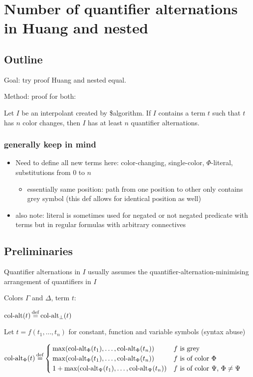 \documentclass[,%
	draft=false,%
	numbers=noendperiod
	12pt,
	a4paper,
	oneside,%
	openany,
]{memoir}
\begin{document}
\chapter{ Number of quantifier alternations in Huang and nested }

\section{ Outline }

Goal: try proof Huang and nested equal.

Method: proof for both:

\begin{cprop}
	Let $I$ be an interpolant created by \$algorithm.
	If $I$ contains a term $t$ such that $t$ has $n$ color changes, then $I$ has at least $n$ quantifier alternations.
\end{cprop}

\subsection{generally keep in mind}

\begin{itemize}
	\item Need to define all new terms here: color-changing, single-color, $\Phi$-literal, substitutions from $0$ to $n$
		\begin{itemize}
			\item essentially same position: path from one position to other only contains grey symbol (this def allows for identical position as well)
		\end{itemize}
	\item also note: literal is sometimes used for negated or not negated predicate with terms but in regular formulas with arbitrary connectives
\end{itemize}

\section{ Preliminaries }

Quantifier alternations in $I$ usually assumes the quantifier-alternation-minimising arrangement of quantifiers in $I$ 

\begin{defi}
	Colors $\Gamma$ and $\Delta$, term $t$:

	$\ca(t) \defeq \ca_\bot(t)$

	Let $t = f(t_1, \dots, t_n)$ for constant, function and variable symbols (syntax abuse)


	$\ca_\Phi(t) \defeq 
	\begin{cases}
		\max(\ca_\Phi(t_1), \dots, \ca_\Phi(t_n)) & \text{$f$ is grey} \\
		\max(\ca_\Phi(t_1), \dots, \ca_\Phi(t_n)) & \text{$f$ is of color $\Phi$} \\
		1 + \max(\ca_\Psi(t_1), \dots, \ca_\Psi(t_n)) & \text{$f$ is of color $\Psi$, $\Phi \neq \Psi$} \\
	\end{cases}
	$
\end{defi}
\end{document}
